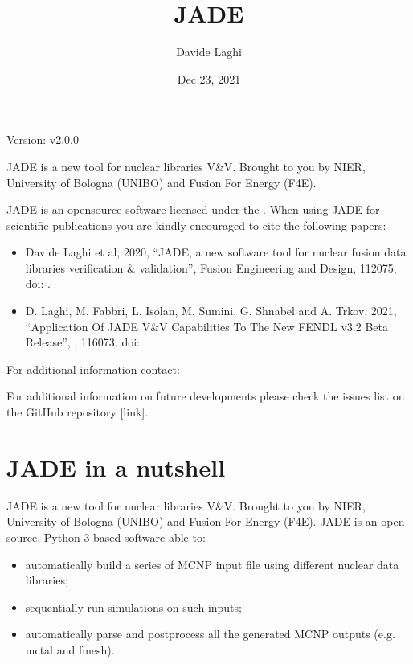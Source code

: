 \documentclass[letterpaper,10pt,english]{sphinxmanual}
\title{JADE}
\date{Dec 23, 2021}
\author{Davide Laghi}
\let\sphinxpxdimen\pdfpxdimen\else\newdimen\sphinxpxdimen
\begin{document}
\pagestyle{empty}
\sphinxmaketitle
\pagestyle{plain}
\sphinxtableofcontents
\pagestyle{normal}
\label{\detokenize{index::doc}}


\sphinxAtStartPar
Version: v2.0.0

\sphinxAtStartPar
JADE is a new tool for nuclear libraries V\&V.
Brought to you by NIER, University of Bologna (UNIBO) and Fusion For Energy (F4E).

\sphinxAtStartPar
JADE is an open\sphinxhyphen{}source software licensed under the {\hyperref[\detokenize{LICENSE:gnulicense}]{}}.
When using JADE for scientific publications you are kindly encouraged to cite the following papers:
\begin{itemize}
\item {} 
\sphinxAtStartPar
Davide Laghi et al, 2020, “JADE, a new software tool for nuclear fusion data libraries verification \& validation”,
Fusion Engineering and Design,  112075, doi: .

\item {} 
\sphinxAtStartPar
D. Laghi, M. Fabbri, L. Isolan, M. Sumini, G. Shnabel and A. Trkov, 2021,
“Application Of JADE V\&V Capabilities To The New FENDL v3.2 Beta Release”,
,  116073. doi: 

\end{itemize}

\sphinxAtStartPar
For additional information contact: 

\sphinxAtStartPar
For additional information on future developments please check the issues list on the
GitHub repository {[}link{]}.


\chapter{JADE in a nutshell}
\label{\detokenize{nutshell:jade-in-a-nutshell}}\label{\detokenize{nutshell::doc}}
\noindent\sphinxincludegraphics[width=600\sphinxpxdimen]{{scheme}.png}

\sphinxAtStartPar
JADE is a new tool for nuclear libraries V\&V.
Brought to you by NIER, University of Bologna (UNIBO) and Fusion For Energy (F4E).
JADE is an open source, Python 3 based software able to:
\begin{itemize}
\item {} 
\sphinxAtStartPar
automatically build a series of MCNP input file using different nuclear
data libraries;

\item {} 
\sphinxAtStartPar
sequentially run simulations on such inputs;

\item {} 
\sphinxAtStartPar
automatically parse and post\sphinxhyphen{}process all the generated MCNP outputs
(e.g. mctal and fmesh).

\end{itemize}
\end{document}
